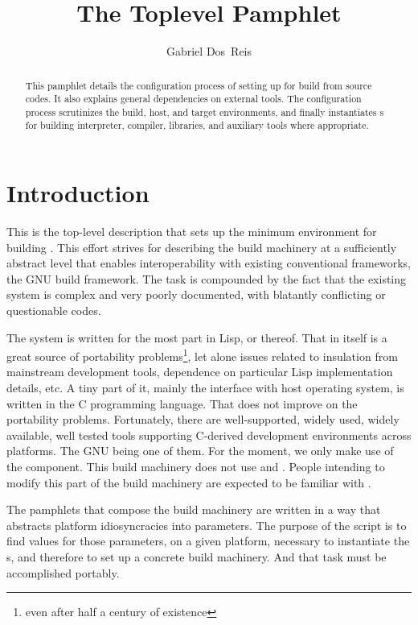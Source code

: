 \documentclass[12pt]{article}
\title{The Toplevel \File{configure.ac} Pamphlet}
\author{Gabriel Dos~Reis}
\begin{document}
\maketitle

\begin{abstract}
  This pamphlet details the configuration process of setting up
   for build from source codes.
  It also explains general dependencies on external tools.
  The configuration process scrutinizes the build, host,  and target
  environments, and finally instantiates s for building
   interpreter, compiler, libraries, and auxiliary tools
  where appropriate.
\end{abstract}

\section{Introduction}
\label{sec:intro}

This is the top-level  description that sets up the
minimum environment for building .  This effort
strives for describing the build machinery at a sufficiently abstract
level that
enables interoperability with existing conventional frameworks, \eg{}
the GNU build framework.
The task is compounded by the fact that the existing  system
is complex and very poorly documented, with blatantly conflicting or
questionable codes.

The  system is written for the most part in Lisp, or
thereof.  That in itself is a great source of portability
problems\footnote{even after half a century of existence},
let alone issues related to insulation from mainstream
development tools, dependence on particular Lisp implementation details, etc.
A tiny part of it, mainly the interface with host operating system, is
written in the C programming language.  That does not improve on the
portability problems.  Fortunately, there are well-supported,
widely used, widely available, well tested tools supporting
C-derived development environments across platforms.  The GNU
 being one of them.  For the moment, we only make use of
the  component.  This build machinery does not
use  and .  People intending to modify
this part of the build machinery are expected to be familiar with
.

The  pamphlets that compose the build machinery are
written in a way that abstracts platform idiosyncracies into
parameters.  The purpose of the  script is to
find values for those parameters, on a given platform, necessary to
instantiate the s, and therefore to set up a concrete
build machinery.  And that task must be accomplished portably.
\end{document}
